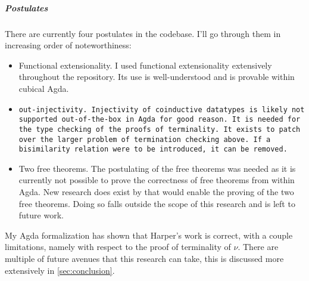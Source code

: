 \subparagraph{Postulates}
There are currently four postulates in the codebase.
I'll go through them in increasing order of noteworthiness:
\begin{itemize}[noitemsep]
  \item Functional extensionality.
  I used functional extensionality extensively throughout the repository.
  Its use is well-understood and is provable within cubical Agda.
  \item \tt{out}-injectivity.
  Injectivity of coinductive datatypes is likely not supported out-of-the-box in Agda for good reason.
  It is needed for the type checking of the proofs of terminality.
  It exists to patch over the larger problem of termination checking above.
  If a bisimilarity relation were to be introduced, it can be removed.
  \item Two free theorems.
  The postulating of the free theorems was needed as it is currently not possible to prove the correctness of free theorems from within Agda.
  New research does exist by \cite{Muylder2024} that would enable the proving of the two free theorems.
  Doing so falls outside the scope of this research and is left to future work.
\end{itemize}

My Agda formalization has shown that Harper's work is correct, with a couple limitations, namely with respect to the proof of terminality of $\nu$.
There are multiple of future avenues that this research can take, this is discussed more extensively in \autoref{sec:conclusion}.
